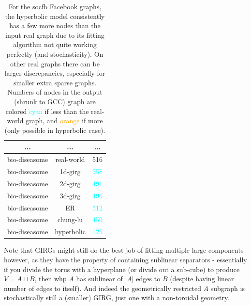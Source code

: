 \begin{table}[]
\begin{tabular}{|c|c|c|}
    ... & ... & ... \\ \hline

    bio-diseasome & real-world & 516 \\ \hline
    bio-diseasome & 1d-girg & \textcolor{cyan}{258} \\ \hline
    bio-diseasome & 2d-girg & \textcolor{cyan}{491} \\ \hline
    bio-diseasome & 3d-girg & \textcolor{cyan}{496} \\ \hline
    bio-diseasome & ER & \textcolor{cyan}{512} \\ \hline
    bio-diseasome & chung-lu & \textcolor{cyan}{459} \\ \hline
    bio-diseasome & hyperbolic & \textcolor{cyan}{125} \\ \hline

    \end{tabular}
    \caption{
    For the socfb Facebook graphs, the hyperbolic model consistently has a few more nodes than the input real graph due to its fitting algorithm not quite working perfectly (and stochasticity).
    On other real graphs there can be larger discrepancies, especially for smaller extra sparse graphs.
    Numbers of nodes in the output (shrunk to GCC) graph are colored \textcolor{cyan}{cyan} if less than the real-world graph, and \textcolor{orange}{orange} if more (only possible in hyperbolic case).
    }
    \label{tab:blasius_HRG_n_fitting_renunciation}
\end{table}
    



Note that GIRGs might still do the best job of fitting multiple large components however, as they have the property of containing sublinear separators - essentially if you divide the torus with a hyperplane (or divide out a sub-cube) to produce $V = A \sqcup B$, then whp $A$ has sublinear of $|A|$ edges to $B$ (despite having linear number of edges to itself). And indeed the geometrically restricted $A$ subgraph is stochastically still a (smaller) GIRG, just one with a non-toroidal geometry.








